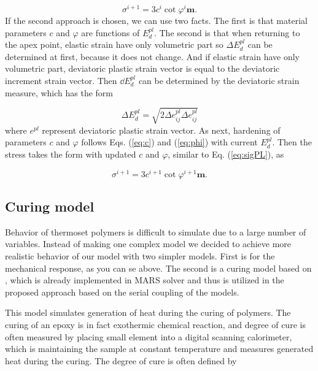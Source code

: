 \begin{equation}\label{eq:sigPL}
	\sigma^{i+1} = 3c^{i} \cot \varphi^{i} \textbf{m}.
\end{equation}
If the second approach is chosen, we can use two facts. The first is that material parameters $c$ and $\varphi$ are functions of $E_d^{pl}$. The second is that when returning to the apex point, elastic strain have only volumetric part so $\Delta E_d^{pl}$ can be determined at first, because it does not change. And if elastic strain have only volumetric part, deviatoric plastic strain vector is equal to the deviatoric increment strain vector. Then $\dd E_d^{pl}$ can be determined by the deviatoric strain measure, which has the form

\begin{equation}\label{eq:sig_i}
	\Delta E_d^{pl} = \sqrt{2\Delta e^{pl}_{ij}\Delta e^{pl}_{ij}}
\end{equation}
where $e^{pl}$ represent deviatoric plastic strain vector. As next, hardening of parameters $c$ and $\varphi$ follows Eqs. (\ref{eq:c}) and (\ref{eq:phi}) with current $E_d^{pl}$. Then the stress takes the form with updated $c$ and $\varphi$, similar to Eq. (\ref{eq:sigPL}), as

\begin{equation}
	\sigma^{i+1} = 3c^{i+1} \cot \varphi^{i+1} \textbf{m}.
\end{equation}


\subsection{Curing model}
\indent

Behavior of thermoset polymers is difficult to simulate due to a large number of variables. Instead of making one complex model we decided to achieve more realistic behavior of our model with two simpler models. First is for the mechanical response, as you can se above. The second is a curing model based on \cite{heinrich2012generation}, which is already implemented in MARS solver \cite{mars} and thus is utilized in the proposed approach based on the serial coupling of the models. 

This model simulates generation of heat during the curing of polymers. The curing of an epoxy is in fact exothermic chemical reaction, and degree of cure is often measured by placing small element into a digital scanning calorimeter, which is maintaining the sample at constant temperature and measures generated heat during the curing. The degree of cure is often defined by

